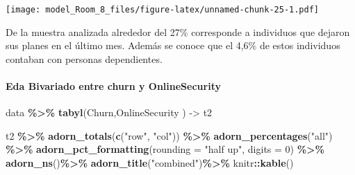 \documentclass[
]{article}
\newenvironment{Shaded}{\begin{snugshade}}{\end{snugshade}}
\newcommand{\AttributeTok}[1]{\textcolor[rgb]{0.13,0.29,0.53}{#1}}
\newcommand{\DecValTok}[1]{\textcolor[rgb]{0.00,0.00,0.81}{#1}}
\newcommand{\FunctionTok}[1]{\textcolor[rgb]{0.13,0.29,0.53}{\textbf{#1}}}
\newcommand{\NormalTok}[1]{#1}
\newcommand{\OtherTok}[1]{\textcolor[rgb]{0.56,0.35,0.01}{#1}}
\newcommand{\SpecialCharTok}[1]{\textcolor[rgb]{0.81,0.36,0.00}{\textbf{#1}}}
\newcommand{\StringTok}[1]{\textcolor[rgb]{0.31,0.60,0.02}{#1}}
\begin{document}
\texttt{[image: model\_Room\_8\_files/figure-latex/unnamed-chunk-25-1.pdf]}

De la muestra analizada alrededor del 27\% corresponde a individuos que
dejaron sus planes en el último mes. Además se conoce que el 4,6\% de
estos individuos contaban con personas dependientes.

\hypertarget{eda-bivariado-entre-churn-y-onlinesecurity}{%
\paragraph{Eda Bivariado entre churn y
OnlineSecurity}\label{eda-bivariado-entre-churn-y-onlinesecurity}}

\begin{Shaded}
\begin{Highlighting}[]
\NormalTok{data }\SpecialCharTok{\%\textgreater{}\%} \FunctionTok{tabyl}\NormalTok{(Churn,OnlineSecurity ) }\OtherTok{{-}\textgreater{}}\NormalTok{ t2}

\NormalTok{t2 }\SpecialCharTok{\%\textgreater{}\%} \FunctionTok{adorn\_totals}\NormalTok{(}\FunctionTok{c}\NormalTok{(}\StringTok{"row"}\NormalTok{, }\StringTok{"col"}\NormalTok{)) }\SpecialCharTok{\%\textgreater{}\%} \FunctionTok{adorn\_percentages}\NormalTok{(}\StringTok{"all"}\NormalTok{) }\SpecialCharTok{\%\textgreater{}\%}
\FunctionTok{adorn\_pct\_formatting}\NormalTok{(}\AttributeTok{rounding =} \StringTok{"half up"}\NormalTok{, }\AttributeTok{digits =} \DecValTok{0}\NormalTok{) }\SpecialCharTok{\%\textgreater{}\%} \FunctionTok{adorn\_ns}\NormalTok{()}\SpecialCharTok{\%\textgreater{}\%} \FunctionTok{adorn\_title}\NormalTok{(}\StringTok{"combined"}\NormalTok{)}\SpecialCharTok{\%\textgreater{}\%}\NormalTok{ knitr}\SpecialCharTok{::}\FunctionTok{kable}\NormalTok{()}
\end{Highlighting}
\end{Shaded}
\end{document}
